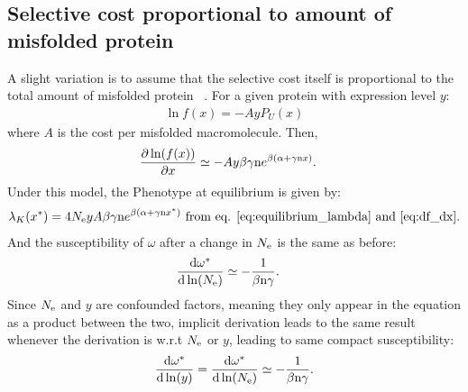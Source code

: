 \subsection{Selective cost proportional to amount of misfolded protein}
A slight variation is to assume that the selective cost itself is proportional to the total amount of misfolded protein ~\citep{Drummond2005a, Wilke2006, Drummond2008, Serohijos2012}. For a given protein with expression level $y$:
\begin{align}
\ln f(x) = - A y P_{U} (x)
\end{align}
where $A$ is the cost per misfolded macromolecule. Then, 
\begin{align}
\frac{\partial \ln (f(x))}{\partial x} & \simeq -A y \beta \gamma \text{n} e^{\beta(\alpha + \gamma \text{n} x)}.
\end{align}
Under this model, the \gls{Phenotype} at equilibrium is given by:
\begin{align}
\lambda_{K}(x^{*}) = 4N_{\mathrm{e}} y A \beta \gamma \text{n} e^{\beta(\alpha + \gamma \text{n} x^{*})} \text{ from eq. \ref{eq:equilibrium_lambda} and \ref{eq:df_dx}}.
\end{align}
And the susceptibility of $\omega$ after a change in $N_{\mathrm{e}}$ is the same as before:
\begin{align}
\frac{ \mathrm{d} \omega^{*}}{\mathrm{d} \ln (N_{\mathrm{e}})} & \simeq - \frac{1}{\beta \text{n} \gamma}.
\end{align}
Since $N_{\mathrm{e}}$ and $y$ are confounded factors, meaning they only appear in the equation as a product between the two, implicit derivation leads to the same result whenever the derivation is w.r.t $N_{\mathrm{e}}$ or $y$, leading to same compact susceptibility:
\begin{align}
\frac{ \mathrm{d} \omega^{*}}{\mathrm{d} \ln (y)} = \frac{ \mathrm{d} \omega^{*}}{\mathrm{d} \ln (N_{\mathrm{e}})} \simeq - \frac{1}{\beta \text{n} \gamma}.
\end{align}

